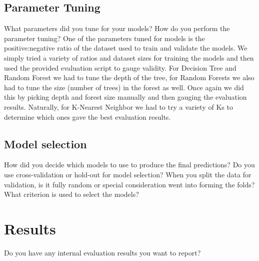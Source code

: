 \documentclass[11pt,a4paper]{article}
\begin{document}
\subsection{Parameter Tuning}
What parameters did you tune for your models? How do you perform the parameter tuning?
One of the parameters tuned for models is the positive:negative ratio of the dataset used to train and validate the models. We simply tried a variety of ratios and dataset sizes for training the models and then used the provided evaluation script to gauge validity. For Decision Tree and Random Forest we had to tune the depth of the tree, for Random Forests we also had to tune the size (number of trees) in the forest as well. Once again we did this by picking depth and forest size manually and then gauging the evaluation results. Naturally, for K-Nearest Neighbor we had to try a variety of Ks to determine which ones gave the best evaluation results. 


\subsection{Model selection}
How did you decide which models to use to produce the final predictions?  Do you use cross-validation or hold-out for model selection? When you split the data for validation, is it fully random or special consideration went into forming the folds? What criterion is used to select the models?


\section{Results}
Do you have any internal evaluation results you want to report?
\end{document}
